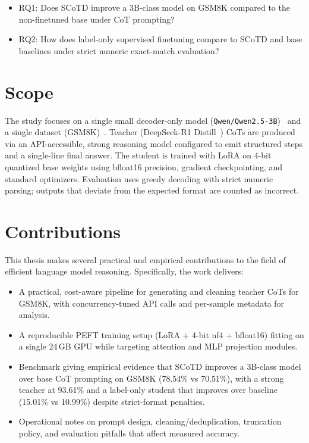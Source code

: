 \begin{itemize}
    \item RQ1: Does SCoTD improve a 3B-class model on GSM8K compared to the non-finetuned base under CoT prompting?
    \item RQ2: How does label-only supervised finetuning compare to SCoTD and base baselines under strict numeric exact-match evaluation?
\end{itemize}

\section*{Scope}
The study focuses on a single small decoder-only model (\texttt{Qwen/Qwen2.5-3B})~\cite{qwen2025qwen25technicalreport} and a single dataset (GSM8K)~\cite{cobbe2021trainingverifierssolvemath}. Teacher (DeepSeek-R1 Distill~\cite{deepseekai2025deepseekr1incentivizingreasoningcapability}) CoTs are produced via an API-accessible, strong reasoning model configured to emit structured steps and a single-line final answer. The student is trained with LoRA on 4-bit quantized base weights using bfloat16 precision, gradient checkpointing, and standard optimizers. Evaluation uses greedy decoding with strict numeric parsing; outputs that deviate from the expected format are counted as incorrect.

\section*{Contributions}
This thesis makes several practical and empirical contributions to the field of efficient language model reasoning. Specifically, the work delivers:

\begin{itemize}
    \item A practical, cost-aware pipeline for generating and cleaning teacher CoTs for GSM8K, with concurrency-tuned API calls and per-sample metadata for analysis.
    \item A reproducible PEFT training setup (LoRA + 4-bit nf4 + bfloat16) fitting on a single 24\,GB GPU while targeting attention and MLP projection modules.
    \item Benchmark giving empirical evidence that SCoTD improves a 3B-class model over base CoT prompting on GSM8K (78.54\% vs 70.51\%), with a strong teacher at 93.61\% and a label-only student that improves over baseline (15.01\% vs 10.99\%) despite strict-format penalties.
    \item Operational notes on prompt design, cleaning/deduplication, truncation policy, and evaluation pitfalls that affect measured accuracy.
\end{itemize}

